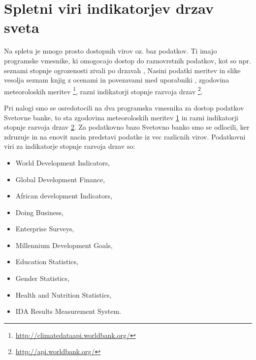 \chapter{Spletni viri indikatorjev drzav sveta}

Na spletu je mnogo prosto dostopnih virov oz. baz podatkov. Ti imajo programske
vmesnike, ki omogocajo dostop do raznovrstnih podatkov, kot so npr. seznami 
stopnje ogrozenosti zivali po drzavah 
,
Nasini podatki meritev in slike vesolja
seznam knjig z ocenami in povezavami med uporabniki
,
zgodovina meteoroloskih meritev
\footnote{\label{climate_api} \url{http://climatedataapi.worldbank.org/}},
razni indikatorji stopnje razvoja drzav
\footnote{\label{indicator_api} \url{http://api.worldbank.org/}}.

Pri nalogi smo se osredotocili na dva programska vmesnika za dostop podatkov 
Svetovne banke, to sta zgodovina meteoroloskih meritev \ref{climate_api} in 
razni indikatorji stopnje razvoja drzav \ref{indicator_api}.
Za podatkovno bazo Svetovno banko smo se odlocili, ker zdruzuje in na enovit
nacin predstavi podatke iz vec razlicnih virov. Podatkovni viri za indikatorje
stopnje razvoja drzav so:

% 
% 
% 
% 



\begin{itemize}  
\item World Development Indicators, 
\item Global Development Finance, 
\item African development Indicators, 
\item Doing Business,
\item Enterprise Surveys, 
\item Millennium Development Goals, 
\item Education Statistics, 
\item Gender Statistics,
\item Health and Nutrition Statistics, 
\item IDA Results Measurement System.
\end{itemize}  

